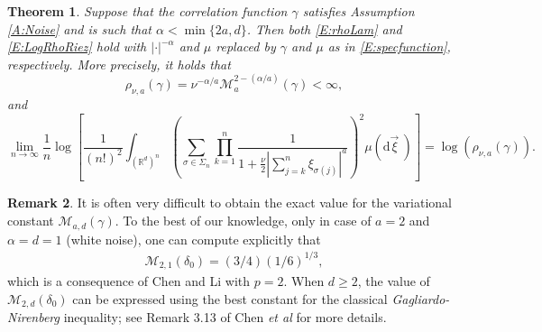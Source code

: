 \documentclass[a4paper,11pt]{article}
\numberwithin{equation}{section}
\numberwithin{equation}{section}
\theoremstyle{plain}
\newtheorem{theorem}{Theorem}[section]
\theoremstyle{definition}
\newtheorem{remark}[theorem]{Remark}
\newcommand{\ud}{\ensuremath{\mathrm{d} }}
\newcommand{\R}{\mathbb{R}}
\begin{document}
\begin{theorem} \label{T:Variation}
  Suppose that the correlation function $\gamma$ satisfies Assumption \ref{A:Noise} and is such that
  $\alpha < \min\{2a,d\}$. Then both \eqref{E:rhoLam} and \eqref{E:LogRhoRiez} hold with
  $|\cdot|^{-\alpha}$ and $\mu$ replaced by $\gamma$ and $\mu$ as in \eqref{E:specfunction},
  respectively. More precisely, it holds that
  \begin{equation} \label{E:rhoMrep}
    \rho_{\nu,a}(\gamma) = \nu^{-\alpha/a} \mathcal{M}_a^{2-(\alpha / a)}(\gamma)<\infty,
  \end{equation}
  and
  \begin{equation} \label{E:LogRho}
    \lim_{n \to \infty} \frac{1}{n} \log \left[ \frac{1}{(n!)^2} \int_{(\R^d)^n} \left( \sum_{\sigma \in \Sigma_n} \prod_{k=1}^n \frac{1}{1+ \frac{\nu}{2}|\sum_{j=k}^n \xi_{\sigma(j)}|^a}\right)^2 \mu (\ud \vec{\xi}\:)\right]
    = \log\left( \rho_{\nu, a}\left(\gamma\right) \right).
  \end{equation}
\end{theorem}

\begin{remark} \label{R:Constant}
  It is often very difficult to obtain the exact value for the variational constant
  $\mathcal{M}_{a,d}(\gamma)$. To the best of our knowledge, only in case of $a=2$ and $\alpha=d=1$
  (white noise), one can compute explicitly that
  \begin{align} \label{E:Mdelta1d}
    \mathcal{M}_{2,1}(\delta_0)= (3/4)(1/6)^{1/3},
  \end{align}
  which is a consequence of Chen and Li \cite[Lemma 7.2]{ChenLi04} with $p=2$. When $d\ge 2$, the
  value of $\mathcal{M}_{2,d}(\delta_0)$ can be expressed using the best constant for the classical
  {\it Gagliardo-Nirenberg} inequality; see Remark 3.13 of Chen {\it et al} \cite{CDOT20} for more
  details.
\end{remark}
\end{document}
